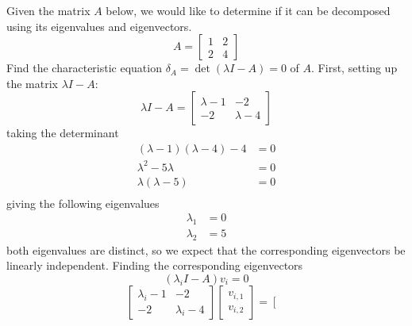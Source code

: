 \begin{example} Given the matrix $A$ below, we would like to determine if it can be decomposed using its eigenvalues and eigenvectors.
\begin{equation*}
  A=
  \left[
    \begin{array}{cc}
      1 & 2 \\ 2 & 4
    \end{array}
  \right]
\end{equation*}
Find the characteristic equation $\delta_{A}=\det(\lambda I-A)=0$ of $A$.
First, setting up the matrix $\lambda I-A$:
\begin{equation*}
  \lambda I-A=
  \left[
    \begin{array}{cc}
      \lambda-1 & -2 \\ -2 & \lambda-4
    \end{array}
  \right]
\end{equation*}
taking the determinant
\begin{equation*}
  \begin{split}
    (\lambda-1)(\lambda-4)-4&=0 \\
    \lambda^{2}-5\lambda&=0 \\
    \lambda(\lambda-5)&=0 \\
  \end{split}
\end{equation*}
giving the following eigenvalues
\begin{equation*}
  \begin{split}
    \lambda_{1}&=0 \\
    \lambda_{2}&=5
  \end{split}
\end{equation*}
both eigenvalues are distinct, so we expect that the corresponding eigenvectors be linearly independent.
Finding the corresponding eigenvectors
\begin{equation*}
  (\lambda_{i} I-A)v_{i}=0
\end{equation*}
\begin{equation*}
  \left[
    \begin{array}{cc}
      \lambda_{i}-1 & -2 \\ -2 & \lambda_{i}-4
    \end{array}
  \right]
  \left[
    \begin{array}{c}
      v_{i,1} \\ v_{i,2}
    \end{array}
  \right]=
  \left[
    \begin{array}{c}

\end{array}
\end{equation*}
\end{example}
